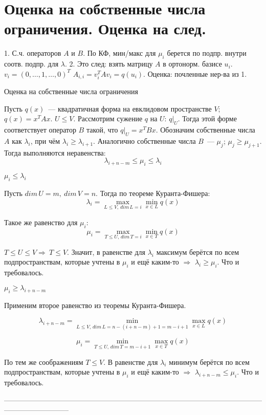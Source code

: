 \section{
 Оценка на собственные числа ограничения. Оценка на след.
}

1. С.ч. операторов $A$ и $B$. По КФ, мин/макс для $\mu_i$ берется по подпр. внутри соотв. подпр. для $\lambda$. 2. Это след: взять матрицу $A$ в ортонорм. базисе $u_i$. $v_i = (0,\dots,1,\dots,0)^T$ $A_{i,i} = v_i^TAv_i = q(u_i)$. Оценка: почленные нер-ва из 1.

\thrm Оценка на собственные числа ограничения

Пусть $q(x)$~--- квадратичная форма на евклидовом пространстве $V$; $q(x) = x^TAx$. $U \le V$. Рассмотрим сужение $q$ на $U$: $q|_U$. Тогда этой форме соответствует оператор $B$ такой, что $q|_U = x^TBx$. Обозначим собственные числа $A$ как $\lambda_i$, при чём $\lambda_i \ge \lambda_{i+1}$. Аналогично собственные числа $B$~--- $\mu_j$; $\mu_j\ge \mu_{j + 1}$. Тогда выполняются неравенства:
$$
\lambda_{i+n-m}\le\mu_i\le\lambda_i
$$

\proof

$\mu_i\le\lambda_i$

Пусть $dim\,U = m,\ dim\,V = n$. Тогда по теореме Куранта-Фишера:
$$
\lambda_i = \max\limits_{L \le V,\,dim\,L = i} \min\limits_{x\in L} q(x) 
$$

Такое же равенство для $\mu_i$:
$$
\mu_i = \max\limits_{T \le U,\,dim\,T = i} \min\limits_{x\in T} q(x) 
$$

$T\le U\le V\Rightarrow\ T\le V$. Значит, в равенстве для $\lambda_i$ максимум берётся по всем подпространствам, которые учтены в $\mu_i$ и ещё каким-то $\Rightarrow$ $\lambda_i \ge \mu_i$. Что и требовалось.

$\mu_i \ge \lambda_{i + n - m}$

Применим второе равенство из теоремы Куранта-Фишера.

$$
\lambda_{i+n-m} = \min\limits_{L \le V,\,dim\,L = n - (i + n - m) + 1 = m - i + 1} \max\limits_{x\in L} q(x) 
$$

$$
\mu_i = \min\limits_{T \le U,\,dim\,T = m - i + 1} \max\limits_{x\in T} q(x) 
$$

По тем же соображениям $T \le V$. В равенстве для $\lambda_i$ минимум берётся по всем подпространствам, которые учтены в $\mu_i$ и ещё каким-то $\Rightarrow$ $\lambda_{i + n - m}\le \mu_i$. Что и требовалось.

\endproof
\ethrm

---------------------------------------------------------------------------------------------------------------------------------------

